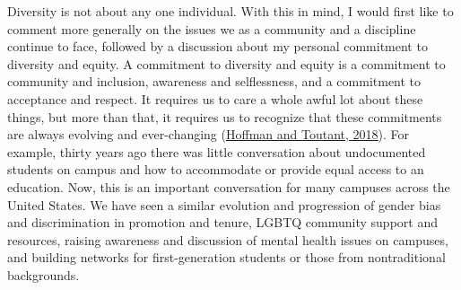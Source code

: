 \documentclass[12pt]{article}
\newcommand{\makeheading}[2][]{\noindent
         \begin{minipage}[t]{\textwidth}%
             {\large \bfseries #2 \hfill #1}\\
             [-0.15\baselineskip]\rule{\columnwidth}{1pt}%
         \end{minipage}}
\begin{document}



\RaggedRight

\noindent Diversity is not about any one individual. With this in mind, I would first like to comment more generally on the issues we as a community and a discipline continue to face, followed by a discussion about my personal commitment to diversity and equity. A commitment to diversity and equity is a commitment to community and inclusion, awareness and selflessness, and a commitment to acceptance and respect. It requires us to care a whole awful lot about these things, but more than that, it requires us to recognize that these commitments are always evolving and ever-changing (\href{https://www.emerald.com/insight/content/doi/10.1108/S2055-364120180000012012/full/html}{Hoffman and Toutant, 2018}). For example, thirty years ago there was little conversation about undocumented students on campus and how to accommodate or provide equal access to an education. Now, this is an important conversation for many campuses across the United States. We have seen a similar evolution and progression of gender bias and discrimination in promotion and tenure, LGBTQ community support and resources, raising awareness and discussion of mental health issues on campuses, and building networks for first-generation students or those from nontraditional backgrounds. 
\end{document}

